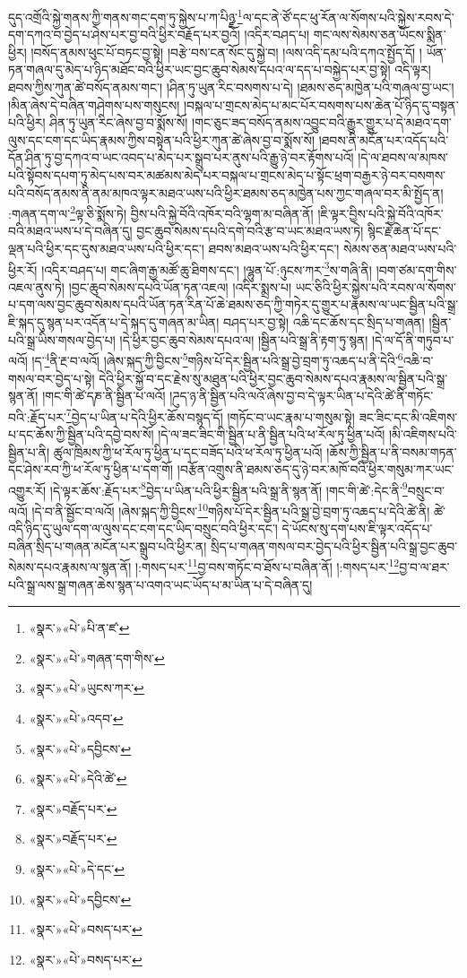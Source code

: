 དུད་འགྲོའི་སྐྱེ་གནས་ཀྱི་གནས་གང་དག་ཏུ་སྐྱེས་པ་ཀ་པིཉྫ་\footnote{«སྣར་»«པེ་»པི་ན་ཛ་}ལ་དང་ནེ་ཙོ་དང་ཕུ་རོན་ལ་སོགས་པའི་སྐྱེས་རབས་དེ་དག་དཀའ་བ་བྱེད་པ་ཤེས་པར་བྱ་བའི་ཕྱིར་བརྗོད་པར་བྱའོ། །འདིར་བཤད་པ། གང་ལས་སེམས་ཅན་ཡོངས་སྨིན་ཕྱིར། །བསོད་ནམས་ཕུང་པོ་བཏང་བྱ་སྟེ། །བརྩེ་བས་ངན་སོང་དུ་སྐྱེ་བ། །ལས་འདི་དམ་པའི་དཀའ་སྤྱོད་དོ། །
ཡོན་ཏན་གཞལ་དུ་མེད་པ་ཉིད་མཐོང་བའི་ཕྱིར་ཡང་བྱང་ཆུབ་སེམས་དཔའ་ལ་དད་པ་བསྐྱེད་པར་བྱ་སྟེ། འདི་ལྟར། ཐབས་ཀྱིས་ཀུན་ཚེ་བསོད་ནམས་གང་། །ཤིན་ཏུ་ཡུན་རིང་བསགས་པ་དེ། །ཐམས་ཅད་མཁྱེན་པའི་གཞལ་བྱ་ཡང་། །མིན་ཞེས་དེ་བཞིན་གཤེགས་པས་གསུངས། །བསྐལ་པ་གྲངས་མེད་པ་མང་པོར་བསགས་པས་ཆེན་པོ་ཉིད་དུ་བསྟན་པའི་ཕྱིར། ཤིན་ཏུ་ཡུན་རིང་ཞེས་བྱ་བ་སྨོས་སོ། །གང་ཅུང་ཟད་བསོད་ནམས་འབྱུང་བའི་རྒྱུར་གྱུར་པ་དེ་མཐའ་དག་ལུས་དང་ངག་དང་ཡིད་རྣམས་ཀྱིས་བསྟེན་པའི་ཕྱིར་ཀུན་ཚེ་ཞེས་བྱ་བ་སྨོས་སོ། །ཐབས་ནི་མངོན་པར་འདོད་པའི་དོན་ཤིན་ཏུ་བྱ་དཀའ་བ་ཡང་འབད་པ་མེད་པར་སྒྲུབ་པར་ནུས་པའི་རྒྱུ་ཉེ་བར་རྟོགས་པའོ། །དེ་ལ་ཐབས་ལ་མཁས་པའི་སྟོབས་དཔག་ཏུ་མེད་པས་བར་མཚམས་མེད་པར་བསྐལ་པ་གྲངས་མེད་པ་སྟོང་ཕྲག་བརྒྱར་ཉེ་བར་བསགས་པའི་བསོད་ནམས་ནི་ནམ་མཁའ་ལྟར་མཐའ་ཡས་པའི་ཕྱིར་ཐམས་ཅད་མཁྱེན་པས་ཀྱང་གཞལ་བར་མི་སྤྱོད་ན། :གཞན་དག་ལ་\footnote{«སྣར་»«པེ་»གཞན་དག་གིས་}ལྟ་ཅི་སྨོས་ཏེ། བྱིས་པའི་སྐྱེ་བོའི་འཁོར་བའི་ལྷག་མ་བཞིན་ནོ། །ཇི་ལྟར་བྱིས་པའི་སྐྱེ་བོའི་འཁོར་བའི་མཐའ་ཡས་པ་དེ་བཞིན་དུ། བྱང་ཆུབ་སེམས་དཔའི་དགེ་བའི་རྩ་བ་ཡང་མཐའ་ཡས་ཏེ། སྙིང་རྗེ་ཆེན་པོ་དང་ལྡན་པའི་ཕྱིར་དང་དུས་མཐའ་ཡས་པའི་ཕྱིར་དང་། ཐབས་མཐའ་ཡས་པའི་ཕྱིར་དང་། སེམས་ཅན་མཐའ་ཡས་པའི་ཕྱིར་རོ། །འདིར་བཤད་པ། གང་ཞིག་རྒྱ་མཚོ་ཆུ་ཐིགས་དང་། །ལྷུན་པོ་:ཉུངས་ཀར་\footnote{«སྣར་»«པེ་»ཡུངས་ཀར་}ས་གཞི་ནི། །བག་ཙམ་དག་གིས་འཇལ་ནུས་ཏེ། །བྱང་ཆུབ་སེམས་དཔའི་ཡོན་ཏན་འཇལ། །འདིར་སྨྲས་པ། ཡང་ཅིའི་ཕྱིར་སྐྱེས་པའི་རབས་ལ་སོགས་པ་དག་ལས་བྱང་ཆུབ་སེམས་དཔའི་ཡོན་ཏན་རིན་པོ་ཆེ་ཐམས་ཅད་ཀྱི་གཏེར་དུ་གྱུར་པ་རྣམས་ལ་ཡང་སྦྱིན་པའི་སྒྲ་ཇི་སྐད་དུ་སྙན་པར་འདོན་པ་དེ་སྐད་དུ་གཞན་མ་ཡིན། བཤད་པར་བྱ་སྟེ། འཆི་དང་ཆོས་དང་སྲིད་པ་གཞན། །སྦྱིན་པའི་སྒྲ་ཡིས་གསལ་བྱེད་པ། །དེ་ཕྱིར་བྱང་ཆུབ་སེམས་དཔའ་ལ། །སྦྱིན་པའི་སྒྲ་ནི་རྟག་ཏུ་སྙན། །དེ་ལ་དོ་ནི་གཏུབ་པ་ལའོ། །ད་\footnote{«སྣར་»«པེ་»འདབ་}ནི་རྔ་བ་ལའོ། །ཞེས་སྐད་ཀྱི་བྱིངས་\footnote{«སྣར་»«པེ་»དབྱིངས་}གཉིས་པོ་དེར་སྦྱིན་པའི་སྒྲ་བྱེ་བྲག་ཏུ་འཆད་པ་ནི་དེའི་\footnote{«སྣར་»«པེ་»དེའི་ཚེ་}འཆི་བ་གསལ་བར་བྱེད་པ་སྟེ། དེའི་ཕྱིར་སྐྱོ་བ་དང་རྗེས་སུ་མཐུན་པའི་ཕྱིར་བྱང་ཆུབ་སེམས་དཔའ་རྣམས་ལ་སྦྱིན་པའི་སྒྲ་སྙན་ནོ། །གང་གི་ཚེ་དཎ་ནི་སྦྱིན་པ་ལའོ། །ཌུད་ཉ་ནི་སྦྱིན་པའི་ལའོ་ཞེས་བྱ་བ་དེ་ལྟར་ཡིན་པ་དེའི་ཚེ་ནི་གཏོང་བའི་:རྗོད་པར་\footnote{«སྣར་»བརྗོད་པར་}བྱེད་པ་ཡིན་པ་དེའི་ཕྱིར་ཆོས་བསྙད་དོ། །གཏོང་བ་ཡང་རྣམ་པ་གསུམ་སྟེ། ཟང་ཟིང་དང་མི་འཇིགས་པ་དང་ཆོས་ཀྱི་སྦྱིན་པའི་དབྱེ་བས་སོ། །དེ་ལ་ཟང་ཟིང་གི་སྦྱིན་པ་ནི་སྦྱིན་པའི་ཕ་རོལ་ཏུ་ཕྱིན་པའོ། །མི་འཇིགས་པའི་སྦྱིན་པ་ནི། ཚུལ་ཁྲིམས་ཀྱི་ཕ་རོལ་ཏུ་ཕྱིན་པ་དང་བཟོད་པའི་ཕ་རོལ་ཏུ་ཕྱིན་པའོ། །ཆོས་ཀྱི་སྦྱིན་པ་ནི་བསམ་གཏན་དང་ཤེས་རབ་ཀྱི་ཕ་རོལ་ཏུ་ཕྱིན་པ་དག་གོ། །བརྩོན་འགྲུས་ནི་ཐམས་ཅད་དུ་ཉེ་བར་མཁོ་བའི་ཕྱིར་གསུམ་ཀར་ཡང་འགྱུར་རོ། །དེ་ལྟར་ཆོས་:རྗོད་པར་\footnote{«སྣར་»བརྗོད་པར་}བྱེད་པ་ཡིན་པའི་ཕྱིར་སྦྱིན་པའི་སྒྲ་ནི་སྙན་ནོ། །གང་གི་ཚེ་:དེང་ནི་\footnote{«སྣར་»«པེ་»དེ་དང་}བསྲུང་བ་ལའོ། །དེ་བ་ནི་སྦྱོང་བ་ལའོ། །ཞེས་སྐད་ཀྱི་བྱིངས་\footnote{«སྣར་»«པེ་»དབྱིངས་}གཉིས་པོ་དེར་སྦྱིན་པའི་སྒྲ་བྱེ་བྲག་ཏུ་འཆད་པ་དེའི་ཚེ་ནི། ཚེ་འདི་ཉིད་དུ་ཡུལ་དག་ལ་ལུས་དང་ངག་དང་ཡིད་བསྲུང་བའི་ཕྱིར་དང་། དེ་ཡོངས་སུ་དག་པས་ཇི་ལྟར་འདོད་པ་བཞིན་སྲིད་པ་གཞན་མངོན་པར་སྒྲུབ་པའི་ཕྱིར་ན། སྲིད་པ་གཞན་གསལ་བར་བྱེད་པའི་ཕྱིར་སྦྱིན་པའི་སྒྲ་བྱང་ཆུབ་སེམས་དཔའ་རྣམས་ལ་སྙན་ནོ། །:གསད་པར་\footnote{«སྣར་»«པེ་»བསད་པར་}བྱ་བས་གཏོང་བ་ཐོས་པ་བཞིན་ནོ། །:གསད་པར་\footnote{«སྣར་»«པེ་»བསད་པར་}བྱ་བ་ལ་ཐར་པའི་སྒྲ་ལས་སྒྲ་གཞན་ཆེས་སྙན་པ་འགའ་ཡང་ཡོད་པ་མ་ཡིན་པ་དེ་བཞིན་དུ། 
